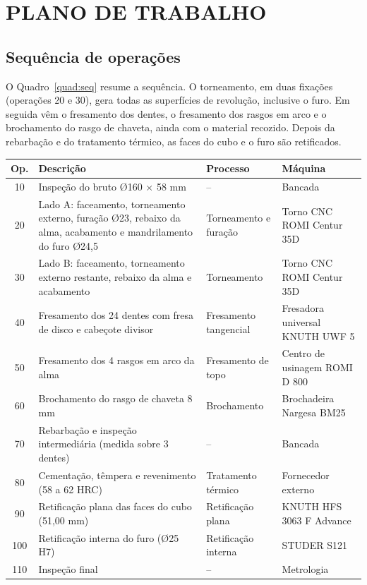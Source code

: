 \chapter{PLANO DE TRABALHO}

\section{Sequência de operações}

O Quadro~\ref{quad:seq} resume a sequência. O torneamento, em duas fixações (operações 20 e 30), gera todas as superfícies de revolução, inclusive o furo. Em seguida vêm o fresamento dos dentes, o fresamento dos rasgos em arco e o brochamento do rasgo de chaveta, ainda com o material recozido. Depois da rebarbação e do tratamento térmico, as faces do cubo e o furo são retificados.

\begin{quadro}[H]
\centering
\caption{Sequência de operações}\label{quad:seq}
{\small\renewcommand{\arraystretch}{1.2}
\begin{tabular}{|c|>{\raggedright\arraybackslash}p{6.2cm}|>{\raggedright\arraybackslash}p{2.6cm}|>{\raggedright\arraybackslash}p{3.3cm}|}
\hline
\rowcolor{cinza} \textbf{Op.} & \textbf{Descrição} & \textbf{Processo} & \textbf{Máquina} \\ \hline
10 & Inspeção do bruto Ø160 $\times$ 58 mm & -- & Bancada \\ \hline
20 & Lado A: faceamento, torneamento externo, furação Ø23, rebaixo da alma, acabamento e mandrilamento do furo Ø24,5 & Torneamento e furação & Torno CNC ROMI Centur 35D \\ \hline
30 & Lado B: faceamento, torneamento externo restante, rebaixo da alma e acabamento & Torneamento & Torno CNC ROMI Centur 35D \\ \hline
40 & Fresamento dos 24 dentes com fresa de disco e cabeçote divisor & Fresamento tangencial & Fresadora universal KNUTH UWF 5 \\ \hline
50 & Fresamento dos 4 rasgos em arco da alma & Fresamento de topo & Centro de usinagem ROMI D 800 \\ \hline
60 & Brochamento do rasgo de chaveta 8 mm & Brochamento & Brochadeira Nargesa BM25 \\ \hline
70 & Rebarbação e inspeção intermediária (medida sobre 3 dentes) & -- & Bancada \\ \hline
80 & Cementação, têmpera e revenimento (58 a 62 HRC) & Tratamento térmico & Fornecedor externo \\ \hline
90 & Retificação plana das faces do cubo (51,00 mm) & Retificação plana & KNUTH HFS 3063 F Advance \\ \hline
100 & Retificação interna do furo (Ø25 H7) & Retificação interna & STUDER S121 \\ \hline
110 & Inspeção final & -- & Metrologia \\ \hline
\end{tabular}}
\end{quadro}

